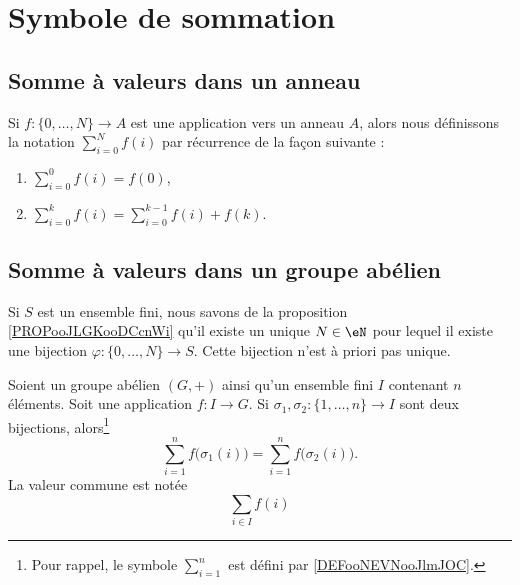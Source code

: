 \section{Symbole de sommation}

\subsection{Somme à valeurs dans un anneau}

\begin{definition}      \label{DEFooNEVNooJlmJOC}
    Si \( f\colon \{ 0,\ldots, N \}\to A\) est une application vers un anneau \( A\), alors nous définissons la notation \( \sum_{i=0}^Nf(i)\) par récurrence de la façon suivante :
    \begin{enumerate}
        \item
            \( \sum_{i=0}^0f(i)=f(0)\),
        \item
            \( \sum_{i=0}^{k}f(i)=\sum_{i=0}^{k-1}f(i)+f(k)\).
    \end{enumerate}
\end{definition}

\subsection{Somme à valeurs dans un groupe abélien}

Si \( S\) est un ensemble fini, nous savons de la proposition \ref{PROPooJLGKooDCcnWi} qu'il existe un unique \( N\in \eN\) pour lequel il existe une bijection \( \varphi\colon \{ 0,\ldots, N \}\to S\). Cette bijection n'est à priori pas unique.

\begin{lemmaDef}       \label{DEFooLNEXooYMQjRo}
    Soient un groupe abélien \( (G,+)\) ainsi qu'un ensemble fini \( I\) contenant \( n\) éléments. Soit une application \( f\colon I\to G \). Si \( \sigma_1,\sigma_2\colon \{1,\ldots, n \}\to I\) sont deux bijections, alors\footnote{Pour rappel, le symbole \( \sum_{i=1}^n\) est défini par \ref{DEFooNEVNooJlmJOC}.}
    \begin{equation}
        \sum_{i=1}^nf\big( \sigma_1(i) \big)=\sum_{i=1}^nf\big( \sigma_2(i) \big).
    \end{equation}
    La valeur commune est notée
    \begin{equation}
        \sum_{i\in I}f(i)
    \end{equation}
\end{lemmaDef}

